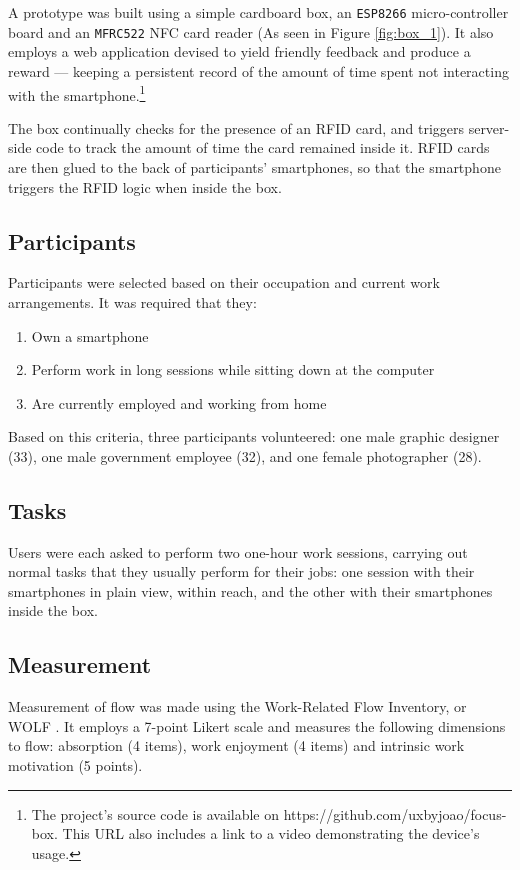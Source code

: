 \documentclass[format=acmsmall]{acmart}
\begin{document}
A prototype was built using a simple cardboard box, an \texttt{ESP8266} micro-controller board and an \texttt{MFRC522} NFC card reader (As seen in Figure \ref{fig:box_1}). It also employs a web application devised to yield friendly feedback and produce a reward --- keeping a persistent record of the amount of time spent not interacting with the smartphone.\footnote{The project's source code is available on https://github.com/uxbyjoao/focus-box. This URL also includes a link to a video demonstrating the device's usage.}

The box continually checks for the presence of an RFID card, and triggers server-side code to track the amount of time the card remained inside it. RFID cards are then glued to the back of participants' smartphones, so that the smartphone triggers the RFID logic when inside the box.

\subsection{Participants}

Participants were selected based on their occupation and current work arrangements. It was required that they:
\begin{enumerate}
    \item Own a smartphone
    \item Perform work in long sessions while sitting down at the computer
    \item Are currently employed and working from home
\end{enumerate}

Based on this criteria, three participants volunteered: one male graphic designer (33), one male government employee (32), and one female photographer (28).

\subsection{Tasks}

Users were each asked to perform two one-hour work sessions, carrying out normal tasks that they usually perform for their jobs: one session with their smartphones in plain view, within reach, and the other with their smartphones inside the box.

\subsection{Measurement}

Measurement of flow was made using the Work-Related Flow Inventory, or WOLF \cite{bakker_2008}. It employs a 7-point Likert scale and measures the following dimensions to flow: absorption (4 items), work enjoyment (4 items) and intrinsic work motivation (5 points).
\end{document}
